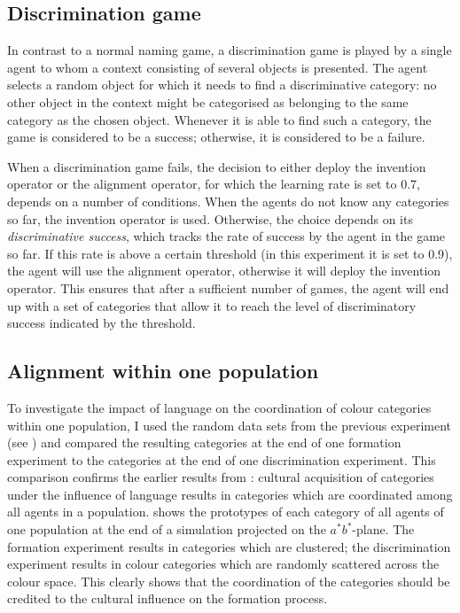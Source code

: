 \subsection{Discrimination game}

In contrast to a normal naming game, a discrimination game is played
by a single agent to whom a context consisting of several objects is
presented. The agent selects a random object for which it needs to
find a discriminative category: no other object in the context might
be categorised as belonging to the same category as the chosen
object. Whenever it is able to find such a category, the game is
considered to be a success; otherwise, it is considered to be a
failure.

When a discrimination game fails, the decision to either deploy the
invention operator or the alignment operator, for which the learning
rate is set to 0.7, depends on a number of conditions. When the agents
do not know any categories so far, the invention operator is used. Otherwise,
the choice depends on its \emph{discriminative success}, which tracks
the rate of success by the agent in the game so far. If this rate is
above a certain threshold (in this experiment it is set to 0.9), the
agent will use the alignment operator, otherwise it will deploy the
invention operator. This ensures that after a sufficient number of
games, the agent will end up with a set of categories that allow it to
reach the level of discriminatory success indicated by the threshold.

\subsection{Alignment within one population}

To investigate the impact of language on the coordination of colour
categories within one population, I used the random data sets from the
previous experiment (see ) and
compared the resulting categories at the end of one formation
experiment to the categories at the end of one discrimination
experiment. This comparison confirms the earlier results from
\cite{steels05coordinating}: cultural acquisition of categories under
the influence of language results in categories which are coordinated
among all agents in a population. 
shows the prototypes of each category of all agents of one population
at the end of a simulation projected on the $a^*b^*$-plane. The
formation experiment results in categories which are clustered; the
discrimination experiment results in colour categories which are
randomly scattered across the colour space. This clearly shows that
the coordination of the categories should be credited to the cultural
influence on the formation process.

